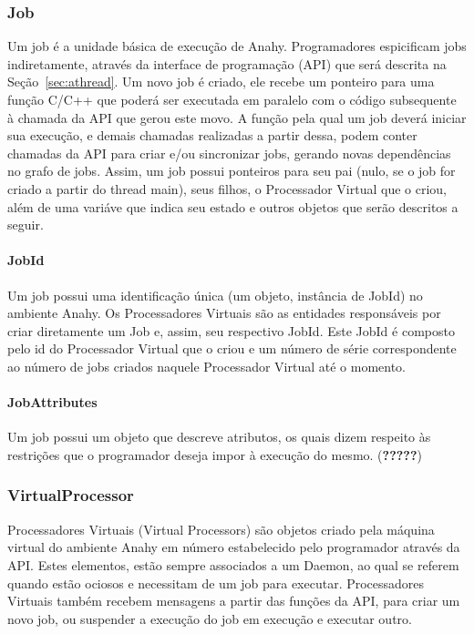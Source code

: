 \documentclass[12pt]{article} usepackage{sbc-template} usepackage{graphicx,url}
\begin{document}
\subsubsection{Job}

Um job é a unidade básica de execução de Anahy. Programadores espicificam jobs indiretamente, através da interface de programação (API) que será descrita na Seção~\ref{sec:athread}. Um novo job é criado, ele recebe um ponteiro para uma função C/C++ que poderá ser executada em paralelo com o código subsequente à chamada da API que gerou este movo. A função pela qual um job deverá iniciar sua execução, e demais chamadas realizadas a partir dessa, podem conter chamadas da API para criar e/ou sincronizar jobs, gerando novas dependências no grafo de jobs. Assim, um job possui ponteiros para seu pai (nulo, se o job for criado a partir do thread main), seus filhos, o Processador Virtual que o criou, além de uma variáve que indica seu estado e outros objetos que serão descritos a seguir.

\paragraph{JobId}

Um job possui uma identificação única (um objeto, instância de JobId) no ambiente Anahy. Os Processadores Virtuais são as entidades responsáveis por criar diretamente um Job e, assim, seu respectivo JobId. Este JobId é composto pelo id do Processador Virtual que o criou e um número de série correspondente ao número de jobs criados naquele Processador Virtual até o momento.

\paragraph{JobAttributes}

Um job possui um objeto que descreve atributos, os quais dizem respeito às restrições que o programador deseja impor à execução do mesmo. (\textbf{?????})

\subsubsection{VirtualProcessor}

Processadores Virtuais (Virtual Processors) são objetos criado pela máquina virtual do ambiente Anahy em número estabelecido pelo programador através da API. Estes elementos, estão sempre associados a um Daemon, ao qual se referem quando estão ociosos e necessitam de um job para executar. Processadores Virtuais também recebem mensagens a partir das funções da API, para criar um novo job, ou suspender a execução do job em execução e executar outro.
\end{document}
